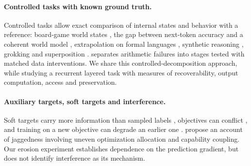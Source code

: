 \paragraph{Controlled tasks with known ground truth.} Controlled tasks allow
exact comparison of internal states and behavior with a reference:
board-game world states \citep{li2023}, the gap between next-token accuracy
and a coherent world model \citep{vafa2024}, extrapolation on formal
languages \citep{deletang2023}, synthetic reasoning \citep{allenzhu2025},
grokking and superposition \citep{nanda2023,elhage2022}. \citet{shintani2026}
separates arithmetic failures into stages tested with matched data
interventions. We share this controlled-decomposition approach, while
studying a recurrent layered task with measures of recoverability, output
computation, access and preservation.

\paragraph{Auxiliary targets, soft targets and interference.} Soft targets
carry more information than sampled labels \citep{hinton2015}, objectives can
conflict \citep{yu2020}, and training on a new objective can degrade an
earlier one \citep{mccloskey1989,kirkpatrick2017}. \citet{shu2026} propose an
account of jaggedness involving uneven optimization allocation and
capability coupling. Our erosion experiment establishes dependence on the
prediction gradient, but does not identify interference as its mechanism.
